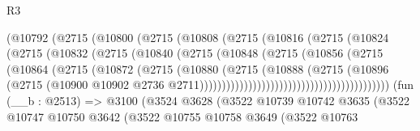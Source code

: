 \begin{lexlean}{R3}
\begin{coremodule}
                                (@10792
                                  (@2715
                                    (@10800
                                      (@2715
                                        (@10808
                                          (@2715
                                            (@10816
                                              (@2715
                                                (@10824
                                                  (@2715
                                                    (@10832
                                                      (@2715
                                                        (@10840
                                                          (@2715
                                                            (@10848
                                                              (@2715
                                                                (@10856
                                                                  (@2715
                                                                    (@10864
                                                                      (@2715
                                                                        (@10872
                                                                          (@2715
                                                                            (@10880
                                                                              (@2715
                                                                                (@10888
                                                                                  (@2715
                                                                                    (@10896
                                                                                      (@2715
                                                                                        (@10900
                                                                                          @10902
                                                                                          @2736
                                                                                          @2711)))))))))))))))))))))))))))))))))))))))))))
    (fun (__b : @2513) =>
    @3100
      (@3524
        @3628
        (@3522
          @10739
          @10742
          @3635
          (@3522
            @10747
            @10750
            @3642
            (@3522
              @10755
              @10758
              @3649
              (@3522
                @10763

\end{coremodule}
\end{lexlean}
